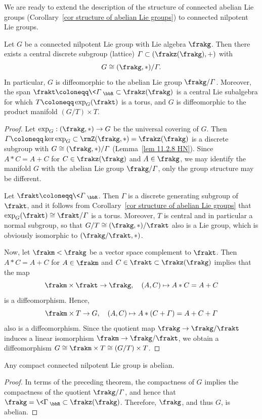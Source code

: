We are ready to extend the description of the structure of connected abelian Lie groups (Corollary~\ref{cor structure of abelian Lie groups}) to connected nilpotent Lie groups.

\begin{thm}
    Let $G$ be a connected nilpotent Lie group with Lie algebra $\frakg$. Then there exists a central discrete subgroup (lattice) $\varGamma\subset(\frakz(\frakg),+)$ with 
    \[G\cong (\frakg,\ast)\slash\varGamma.\]
    In particular, $G$ is diffeomorphic to the abelian Lie group $\frakg\slash\varGamma$. Moreover, the span $\frakt\coloneqq \<\varGamma\>_\bbR\subset\frakz(\frakg)$ is a central Lie subalgebra for which $T\coloneqq \exp_G(\frakt)$ is a torus, and $G$ is diffeomorphic to the product manifold $(G\slash T)\times T$.
\end{thm}
\begin{proof}
    Let $\exp_G:(\frakg,\ast)\to G$ be the universal covering of $G$. Then $\varGamma\coloneqq\ker\exp_G\subset \rmZ(\frakg,\ast)=\frakz(\frakg)$ is a discrete subgroup with $G\cong (\frakg,\ast)\slash\varGamma$ (Lemma~\ref{lem 11.2.8 HN}). Since $A\ast C=A+C$ for $C\in\frakz(\frakg)$ and $A\in\frakg$, we may identify the manifold $G$ with the abelian Lie group $\frakg\slash \varGamma$, only the group structure may be different.

    Let $\frakt\coloneqq \<\varGamma\>_\bbR$. Then $\varGamma$ is a discrete generating subgroup of $\frakt$, and it follows from Corollary~\ref{cor structure of abelian Lie groups} that $\exp_G(\frakt)\cong\frakt\slash\varGamma$ is a torus. Moreover, $T$ is central and in particular a normal subgroup, so that $G\slash T\cong (\frakg,\ast)\slash \frakt$ also is a Lie group, which is obviously isomorphic to $(\frakg\slash\frakt,\ast)$.

    Now, let $\frakm<\frakg$ be a vector space complement to $\frakt$. Then $A\ast C=A+C$ for $A\in\frakm$ and $C\in\frakt\subset\frakz(\frakg)$ implies that the map 
    \[\frakm\times\frakt\to\frakg,\quad (A,C)\mapsto A\ast C=A+C\]
    is a diffeomorphism. Hence, 
    \[\frakm\times T\to G,\quad (A,C)\mapsto A\ast(C+\varGamma)=A+C+\varGamma\]
    also is a diffeomorphism. Since the quotient map $\frakg\to\frakg\slash\frakt$ induces a linear isomorphism $\frakm\to\frakg\slash\frakt$, we obtain a diffeomorphism $G\cong \frakm\times T\cong (G\slash T)\times T$.
\end{proof}


\begin{cor}[{\cite[Cor.~11.2.11]{HN}}]
    Any compact connected nilpotent Lie group is abelian.
\end{cor}
\begin{proof}
    In terms of the preceding theorem, the compactness of $G$ implies the compactness of the quotient $\frakg\slash\varGamma$, and hence that $\frakg=\<\Gamma\>_\bbR\subset\frakz(\frakg)$. Therefore, $\frakg$, and thus $G$, is abelian.
\end{proof}

